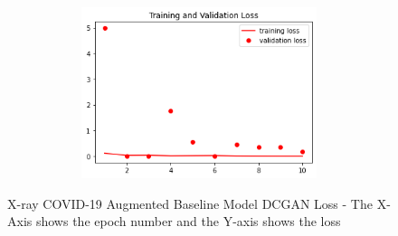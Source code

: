  \begin{figure}[H]
    \centering
    \includegraphics[width=1\textwidth,height=5cm,keepaspectratio]{Images/XceptionBaselineTrainingValidationLossXRayCOVID19AugmentedDCGAN.png}\\
    \caption{X-ray COVID-19 Augmented Baseline Model DCGAN Loss - The X-Axis shows the epoch number and the Y-axis shows the loss}
    \label{fig:X-ray COVID-19 Augmented Xception Model DCGAN Loss}
\end{figure}

